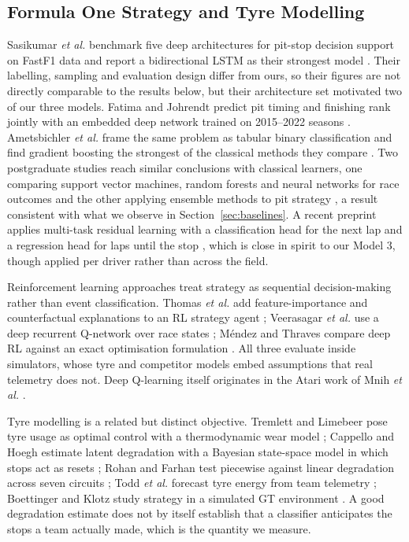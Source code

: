 \documentclass[conference]{IEEEtran}
\begin{document}
\subsection{Formula One Strategy and Tyre Modelling}

Sasikumar \emph{et al.} benchmark five deep architectures for pit-stop decision support on FastF1 data and report a bidirectional LSTM as their strongest model \cite{sasikumar2025pit}. Their labelling, sampling and evaluation design differ from ours, so their figures are not directly comparable to the results below, but their architecture set motivated two of our three models. Fatima and Johrendt predict pit timing and finishing rank jointly with an embedded deep network trained on 2015--2022 seasons \cite{fatima2023deepracing}. Ametsbichler \emph{et al.} frame the same problem as tabular binary classification and find gradient boosting the strongest of the classical methods they compare \cite{ametsbichler2025gbm}. Two postgraduate studies reach similar conclusions with classical learners, one comparing support vector machines, random forests and neural networks for race outcomes and the other applying ensemble methods to pit strategy \cite{aalto2023f1ml,maheshrao2023ensemble}, a result consistent with what we observe in Section~\ref{sec:baselines}. A recent preprint applies multi-task residual learning with a classification head for the next lap and a regression head for laps until the stop \cite{sosta2025multitask}, which is close in spirit to our Model 3, though applied per driver rather than across the field.

Reinforcement learning approaches treat strategy as sequential decision-making rather than event classification. Thomas \emph{et al.} add feature-importance and counterfactual explanations to an RL strategy agent \cite{thomas2025explainable}; Veerasagar \emph{et al.} use a deep recurrent Q-network over race states \cite{veerasagar2025optimum}; M\'endez and Thraves compare deep RL against an exact optimisation formulation \cite{mendez2025pitstop}. All three evaluate inside simulators, whose tyre and competitor models embed assumptions that real telemetry does not. Deep Q-learning itself originates in the Atari work of Mnih \emph{et al.} \cite{mnih2013atari}.

Tyre modelling is a related but distinct objective. Tremlett and Limebeer pose tyre usage as optimal control with a thermodynamic wear model \cite{tremlett2016tyre}; Cappello and Hoegh estimate latent degradation with a Bayesian state-space model in which stops act as resets \cite{cappello2026statespace}; Rohan and Farhan test piecewise against linear degradation across seven circuits \cite{rohan2026piecewise}; Todd \emph{et al.} forecast tyre energy from team telemetry \cite{todd2025tyreenergy}; Boettinger and Klotz study strategy in a simulated GT environment \cite{boettinger2023nordschleife}. A good degradation estimate does not by itself establish that a classifier anticipates the stops a team actually made, which is the quantity we measure.
\end{document}
